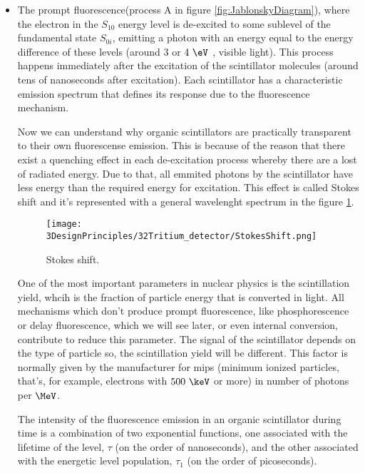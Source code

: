 \begin{itemize}

\item{} The prompt fluorescence(process A in figure \ref{fig:JablonskyDiagram}), where the electron in the $S_{10}$ energy level  is de-excited to some sublevel of the fundamental state $S_{0i}$, emitting a photon with an energy equal to the energy difference of these levels (around $3$ or $4~\eV$ , visible light). This process happens immediately after the excitation of the scintillator molecules (around tens of nanoseconds after excitation). Each scintillator has a characteristic emission spectrum that defines its response due to the fluorescence mechanism. 

Now we can understand why organic scintillators are practically transparent to their own fluorescense emission. This is because of the reason that there exist a quenching effect in each de-excitation process whereby there are a lost of radiated energy. Due to that, all emmited  photons by the scintillator have less energy than the required energy for excitation. This effect is called Stokes shift and it's represented with a general wavelenght spectrum in the figure \ref{fig:StokesShift}.

\begin{figure}[htbp]
\centering
\texttt{[image: 3DesignPrinciples/32Tritium\_detector/StokesShift.png]}
\caption{Stokes shift.\label{fig:StokesShift}~\cite{Knoll}}
\end{figure}

One of the most important parameters in nuclear physics is the scintillation yield, whcih is the fraction of particle energy that is converted in light. All mechanisms which don't produce prompt fluorescence, like phosphorescence or delay fluorescence, which we will see later, or even internal conversion, contribute to reduce this parameter. The signal of the scintillator depends on the type of particle so, the scintillation yield will be different. This factor is normally given by the manufacturer for mips (minimum ionized particles, that's, for example, electrons with $500~\keV$ or more) in number of photons per $\MeV$.

The intensity of the fluorescence emission in an organic scintillator during time is a combination of two exponential functions, one associated with the lifetime of the level, $\tau$ (on the order of nanoseconds), and the other associated with the energetic level population, $\tau_1$ (on the order of picoseconds).


\end{itemize}
